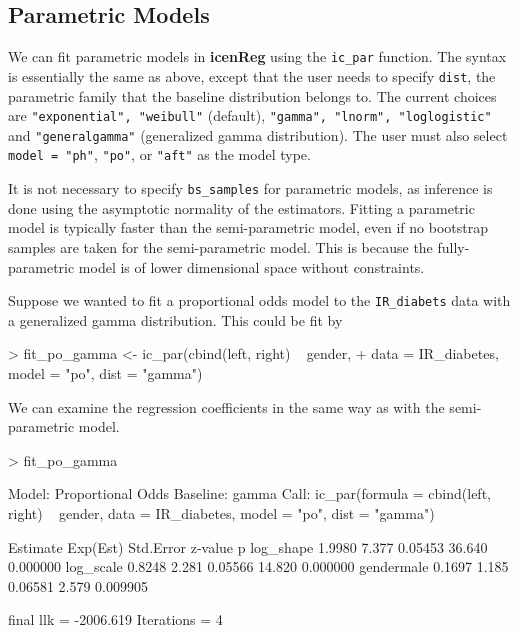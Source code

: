 \documentclass[a4paper]{article}
\begin{document}
\subsection{Parametric Models}
  
We can fit parametric models in {\bf icenReg} using the \texttt{ic\_par} function. The syntax is essentially the same as above, except that the user needs to specify \texttt{dist}, the parametric family that the baseline distribution belongs to. The current choices are \texttt{"exponential", "weibull"} (default), \texttt{"gamma", "lnorm", "loglogistic"} and \texttt{"generalgamma"} (generalized gamma distribution). The user must also select \texttt{model = "ph"},  \texttt{"po"}, or \texttt{"aft"} as the model type. 
  
It is not necessary to specify \texttt{bs\_samples} for parametric models, as inference is done using the asymptotic normality of the estimators. Fitting a parametric model is typically faster than the semi-parametric model, even if no bootstrap samples are taken for the semi-parametric model. This is because the fully-parametric model is of lower dimensional space without constraints. 
  
Suppose we wanted to fit a proportional odds model to the \texttt{IR\_diabets} data with a generalized gamma distribution. This could be fit by
  
\begin{Schunk}
\begin{Sinput}
> fit_po_gamma <- ic_par(cbind(left, right) ~ gender,
+     data = IR_diabetes, model = "po", dist = "gamma")
\end{Sinput}
\end{Schunk}

  We can examine the regression coefficients in the same way as with the semi-parametric model.
  

\begin{Schunk}
\begin{Sinput}
> fit_po_gamma
\end{Sinput}
\begin{Soutput}
Model:  Proportional Odds
Baseline:  gamma 
Call: ic_par(formula = cbind(left, right) ~ gender, data = IR_diabetes, 
    model = "po", dist = "gamma")

           Estimate Exp(Est) Std.Error z-value        p
log_shape    1.9980    7.377   0.05453  36.640 0.000000
log_scale    0.8248    2.281   0.05566  14.820 0.000000
gendermale   0.1697    1.185   0.06581   2.579 0.009905

final llk =  -2006.619 
Iterations =  4 
\end{Soutput}
\end{Schunk}
\end{document}
